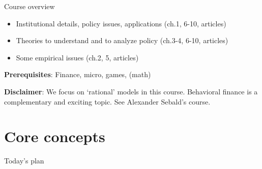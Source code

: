 \documentclass[english,10pt
,aspectratio=169
]{beamer}
\begin{document}
\begin{frame}{Course overview}
\begin{itemize}
	\item Institutional details, policy issues, applications (ch.1, 6-10, articles)
	\item Theories to understand and to analyze policy (ch.3-4, 6-10, articles)
	\item Some empirical issues (ch.2, 5, articles)
\end{itemize}

\textbf{Prerequisites}: Finance, micro, games, (math)

\textbf{Disclaimer}: We focus on `rational' models in this course.
Behavioral finance is a complementary and exciting topic. See
Alexander Sebald's course.
\end{frame}




%


\section{Core concepts}

\begin{frame}{Today's plan}
	\tableofcontents[currentsection]
\end{frame}
\end{document}
